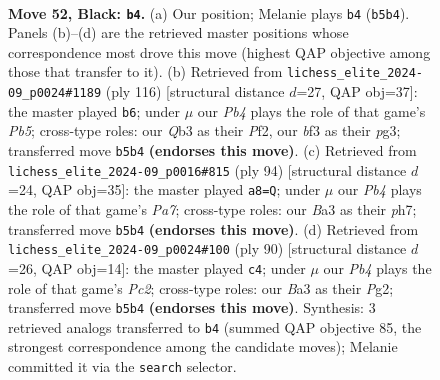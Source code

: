 \documentclass[11pt]{article}
\begin{document}
\clearpage

\begin{figure}[p]\centering
\begin{subfigure}{0.46\textwidth}\centering
\resizebox{\linewidth}{!}{%
\newchessgame
\chessboard[
  setfen={8/p7/5P2/1p4R1/3k4/bq3BK1/8/8 b - - 0 52},
  showmover=false,
  pgfstyle=straightmove, color=movearrow, markmove={b5-b4}
]}
\caption{}
\end{subfigure}\hfill
\begin{subfigure}{0.46\textwidth}\centering
\resizebox{\linewidth}{!}{%
\newchessgame
\chessboard[
  setfen={8/3Q2bk/6p1/1P6/8/6p1/5P2/6K1 w - - 0 59},
  showmover=false,
  pgfstyle=straightmove, color=movearrow, markmove={b5-b6}
]}
\caption{}
\end{subfigure}
\\[4pt]
\begin{subfigure}{0.46\textwidth}\centering
\resizebox{\linewidth}{!}{%
\newchessgame
\chessboard[
  setfen={8/PQ2bk1p/7P/r5p1/8/2P5/6K1/8 w - - 0 48},
  showmover=false,
  pgfstyle=straightmove, color=movearrow, markmove={a7-a8}
]}
\caption{}
\end{subfigure}\hfill
\begin{subfigure}{0.46\textwidth}\centering
\resizebox{\linewidth}{!}{%
\newchessgame
\chessboard[
  setfen={1kbQ4/8/6r1/5p2/4p3/8/2P3P1/3K4 w - - 7 46},
  showmover=false,
  pgfstyle=straightmove, color=movearrow, markmove={c2-c4}
]}
\caption{}
\end{subfigure}
\caption{\textbf{Move 52, Black: \texttt{b4}.} (a) Our position; Melanie plays \texttt{b4} (\texttt{b5b4}). Panels (b)--(d) are the retrieved master positions whose correspondence most drove this move (highest QAP objective among those that transfer to it). (b) Retrieved from \texttt{lichess\_elite\_2024-09\_p0024\#1189} (ply 116) [structural distance $d$=27, QAP obj=37]: the master played \texttt{b6}; under $\mu$ our \emph{Pb4} plays the role of that game's \emph{Pb5}; cross-type roles: our \emph{Q}b3 as their \emph{P}f2, our \emph{b}f3 as their \emph{p}g3; transferred move \texttt{b5b4} \textbf{(endorses this move)}. (c) Retrieved from \texttt{lichess\_elite\_2024-09\_p0016\#815} (ply 94) [structural distance $d$=24, QAP obj=35]: the master played \texttt{a8=Q}; under $\mu$ our \emph{Pb4} plays the role of that game's \emph{Pa7}; cross-type roles: our \emph{B}a3 as their \emph{p}h7; transferred move \texttt{b5b4} \textbf{(endorses this move)}. (d) Retrieved from \texttt{lichess\_elite\_2024-09\_p0024\#100} (ply 90) [structural distance $d$=26, QAP obj=14]: the master played \texttt{c4}; under $\mu$ our \emph{Pb4} plays the role of that game's \emph{Pc2}; cross-type roles: our \emph{B}a3 as their \emph{P}g2; transferred move \texttt{b5b4} \textbf{(endorses this move)}. Synthesis: 3 retrieved analogs transferred to \texttt{b4} (summed QAP objective 85, the strongest correspondence among the candidate moves); Melanie committed it via the \texttt{search} selector.}
\label{fig:thought-m103}
\end{figure}
\end{document}
